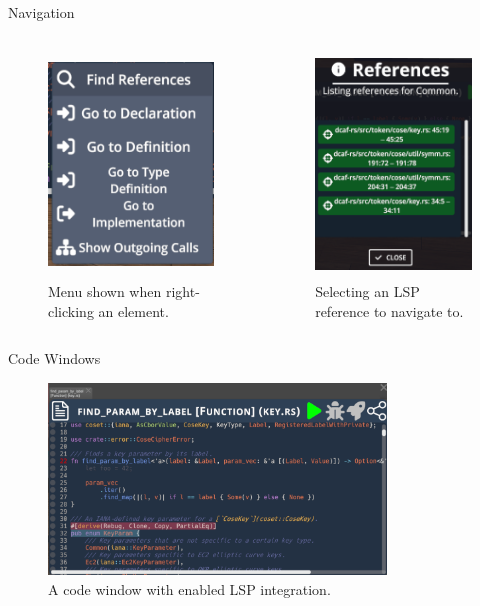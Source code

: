 \documentclass[xcolor={dvipsnames},aspectratio=169,compress,final]{beamer}
\begin{document}
\begin{frame}{Navigation}
	\begin{columns}
		\begin{figure}
			\begin{center}
				\includegraphics[height=6cm]{figures/CodeWindowContext}
			\end{center}
			\caption{Menu shown when right-clicking an element.}
		\end{figure}

		\begin{figure}
			\begin{center}
				\includegraphics[height=6cm]{figures/CodeWindowReferences}
			\end{center}
			\caption{Selecting an LSP reference to navigate to.}
		\end{figure}
	\end{columns}
\end{frame}



\begin{frame}{Code Windows}
	\begin{figure}
		\begin{center}
			\includegraphics[width=0.8\textwidth]{figures/CodeWindow}
		\end{center}
		\caption{A code window with enabled LSP integration.}
	\end{figure}
\end{frame}
\end{document}
